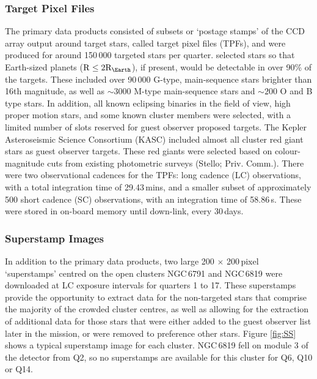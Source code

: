 \subsubsection{Target Pixel Files}
The primary data products consisted of subsets or `postage stamps' of the CCD array output around target stars, called target pixel files (TPFs), and were produced for around 150\,000 targeted stars per quarter. \cite{batalha_selection_2010} selected stars so that Earth-sized planets ($\mathrm{R} \leq 2\mathrm{R_{\Earth}}$), if present, would be detectable in over 90\% of the targets. These included over 90\,000 G-type, main-sequence stars brighter than 16th magnitude, as well as $\sim 3000$ M-type main-sequence stars and $\sim 200$ O and B type stars. In addition, all known eclipsing binaries in the field of view, high proper motion stars, and some known cluster members were selected, with a limited number of slots reserved for guest observer proposed targets. The Kepler Asteroseismic Science Consortium (KASC) included almost all cluster red giant stars as guest observer targets. These red giants were selected based on colour-magnitude cuts from existing photometric surveys (Stello; Priv. Comm.). There were two observational cadences for the TPFs: long cadence (LC) observations, with a total integration time of 29.43\,mins, and a smaller subset of approximately 500 short cadence (SC) observations, with an integration time of 58.86\,s. These were stored in on-board memory until down-link, every 30\,days. 

\subsubsection{Superstamp Images}
In addition to the primary data products, two large 200 $\times$ 200\,pixel `superstamps' centred on the open clusters NGC\,6791 and NGC\,6819 were downloaded at LC exposure intervals for quarters 1 to 17. These superstamps provide the opportunity to extract data for the non-targeted stars that comprise the majority of the crowded cluster centres, as well as allowing for the extraction of additional data for those stars that were either added to the guest observer list later in the \Kepler{} mission, or were removed to preference other stars. Figure \ref{fig:SS} shows a typical superstamp image for each cluster. NGC\,6819 fell on module 3 of the detector from Q2, so no superstamps are available for this cluster for Q6, Q10 or Q14.


